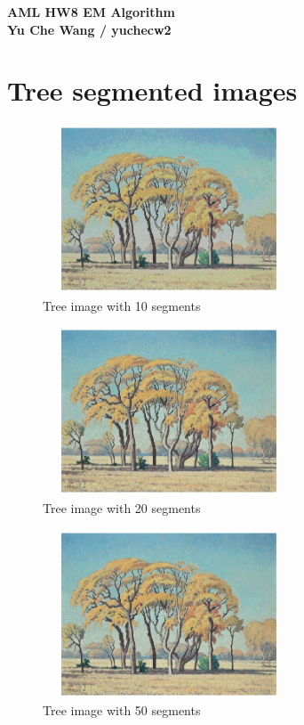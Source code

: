 \documentclass[a4paper, 11pt]{article}
\begin{document}
\noindent
\LARGE\textbf{AML HW8 EM Algorithm} \\
\large\textbf{Yu Che Wang / yuchecw2} \\

\section{Tree segmented images}
\begin{figure}[h!]
\centering
    \includegraphics[width=7.5cm, height=5cm]{images/Tree_10.jpeg}
    \caption{Tree image with 10 segments}
\end{figure}
\begin{figure}[h!]
\centering
    \includegraphics[width=7.5cm, height=5cm]{images/Tree_20.jpeg}
    \caption{Tree image with 20 segments}
\end{figure}
\begin{figure}[h!]
\centering
    \includegraphics[width=7.5cm, height=5cm]{images/Tree_50.jpeg}
    \caption{Tree image with 50 segments}
\end{figure}
\clearpage
\end{document}
